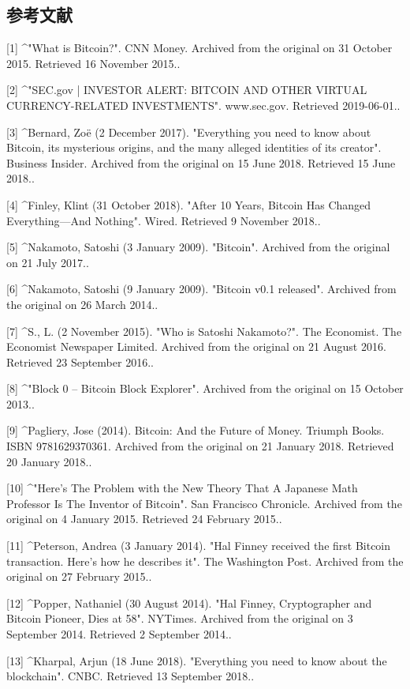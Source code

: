 \subsection{参考文献}
[1]
^"What is Bitcoin?". CNN Money. Archived from the original on 31 October 2015. Retrieved 16 November 2015..

[2]
^"SEC.gov | INVESTOR ALERT: BITCOIN AND OTHER VIRTUAL CURRENCY-RELATED INVESTMENTS". www.sec.gov. Retrieved 2019-06-01..

[3]
^Bernard, Zoë (2 December 2017). "Everything you need to know about Bitcoin, its mysterious origins, and the many alleged identities of its creator". Business Insider. Archived from the original on 15 June 2018. Retrieved 15 June 2018..

[4]
^Finley, Klint (31 October 2018). "After 10 Years, Bitcoin Has Changed Everything—And Nothing". Wired. Retrieved 9 November 2018..

[5]
^Nakamoto, Satoshi (3 January 2009). "Bitcoin". Archived from the original on 21 July 2017..

[6]
^Nakamoto, Satoshi (9 January 2009). "Bitcoin v0.1 released". Archived from the original on 26 March 2014..

[7]
^S., L. (2 November 2015). "Who is Satoshi Nakamoto?". The Economist. The Economist Newspaper Limited. Archived from the original on 21 August 2016. Retrieved 23 September 2016..

[8]
^"Block 0 – Bitcoin Block Explorer". Archived from the original on 15 October 2013..

[9]
^Pagliery, Jose (2014). Bitcoin: And the Future of Money. Triumph Books. ISBN 9781629370361. Archived from the original on 21 January 2018. Retrieved 20 January 2018..

[10]
^"Here's The Problem with the New Theory That A Japanese Math Professor Is The Inventor of Bitcoin". San Francisco Chronicle. Archived from the original on 4 January 2015. Retrieved 24 February 2015..

[11]
^Peterson, Andrea (3 January 2014). "Hal Finney received the first Bitcoin transaction. Here's how he describes it". The Washington Post. Archived from the original on 27 February 2015..

[12]
^Popper, Nathaniel (30 August 2014). "Hal Finney, Cryptographer and Bitcoin Pioneer, Dies at 58". NYTimes. Archived from the original on 3 September 2014. Retrieved 2 September 2014..

[13]
^Kharpal, Arjun (18 June 2018). "Everything you need to know about the blockchain". CNBC. Retrieved 13 September 2018..

